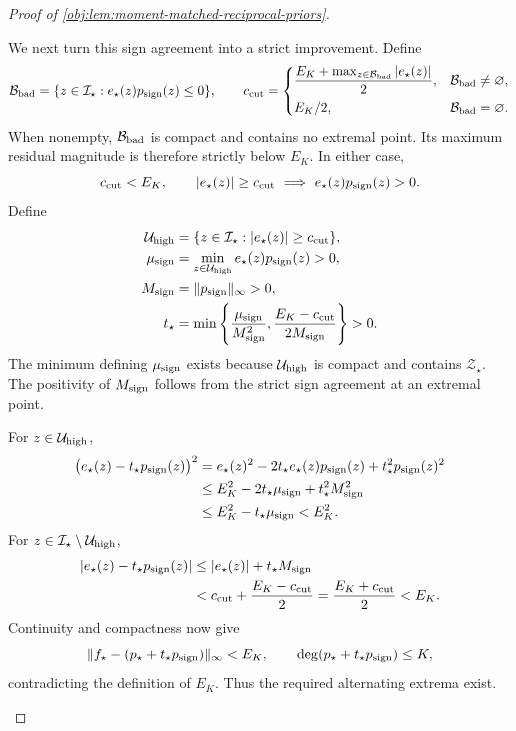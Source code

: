 \begin{proof}[Proof of \cref{obj:lem:moment-matched-reciprocal-priors}]
\begin{enumerate}
We next turn this sign agreement into a strict improvement. Define
\[
\mathcal B_{\rm bad}
=\{z\in\mathcal I_\star:e_\star(z)p_{\rm sign}(z)\le0\},
\qquad
c_{\rm cut}
=
\begin{cases}
\displaystyle
\frac{E_K+\max_{z\in\mathcal B_{\rm bad}}|e_\star(z)|}{2},
&\mathcal B_{\rm bad}\ne\varnothing,\\[6pt]
E_K/2,&\mathcal B_{\rm bad}=\varnothing.
\end{cases}
\]
When nonempty, \(\mathcal B_{\rm bad}\) is compact and contains no extremal point. Its maximum residual magnitude is therefore strictly below \(E_K\). In either case,
\[
c_{\rm cut}<E_K,\qquad
|e_\star(z)|\ge c_{\rm cut}
\ \Longrightarrow\
e_\star(z)p_{\rm sign}(z)>0.
\]
Define
\[
\begin{aligned}
\mathcal U_{\rm high}
&=\{z\in\mathcal I_\star:|e_\star(z)|\ge c_{\rm cut}\},\\
\mu_{\rm sign}
&=\min_{z\in\mathcal U_{\rm high}}
  e_\star(z)p_{\rm sign}(z)>0,\\
M_{\rm sign}
&=\|p_{\rm sign}\|_\infty>0,\\
t_\star
&=\min\left\{
\frac{\mu_{\rm sign}}{M_{\rm sign}^2},
\frac{E_K-c_{\rm cut}}{2M_{\rm sign}}
\right\}>0.
\end{aligned}
\]
The minimum defining \(\mu_{\rm sign}\) exists because \(\mathcal U_{\rm high}\) is compact and contains \(\mathcal Z_\star\). The positivity of \(M_{\rm sign}\) follows from the strict sign agreement at an extremal point.

For \(z\in\mathcal U_{\rm high}\),
\[
\begin{aligned}
\bigl(e_\star(z)-t_\star p_{\rm sign}(z)\bigr)^2
&=e_\star(z)^2
 -2t_\star e_\star(z)p_{\rm sign}(z)
 +t_\star^2p_{\rm sign}(z)^2\\
&\le E_K^2-2t_\star\mu_{\rm sign}
       +t_\star^2M_{\rm sign}^2\\
&\le E_K^2-t_\star\mu_{\rm sign}
<E_K^2.
\end{aligned}
\]
For \(z\in\mathcal I_\star\setminus\mathcal U_{\rm high}\),
\[
\begin{aligned}
|e_\star(z)-t_\star p_{\rm sign}(z)|
&\le |e_\star(z)|+t_\star M_{\rm sign}\\
&<c_{\rm cut}+\frac{E_K-c_{\rm cut}}2
=\frac{E_K+c_{\rm cut}}2<E_K.
\end{aligned}
\]
Continuity and compactness now give
\[
\|f_\star-(p_\star+t_\star p_{\rm sign})\|_\infty<E_K,
\qquad
\deg(p_\star+t_\star p_{\rm sign})\le K,
\]
contradicting the definition of \(E_K\). Thus the required alternating extrema exist.


\end{enumerate}
\end{proof}
